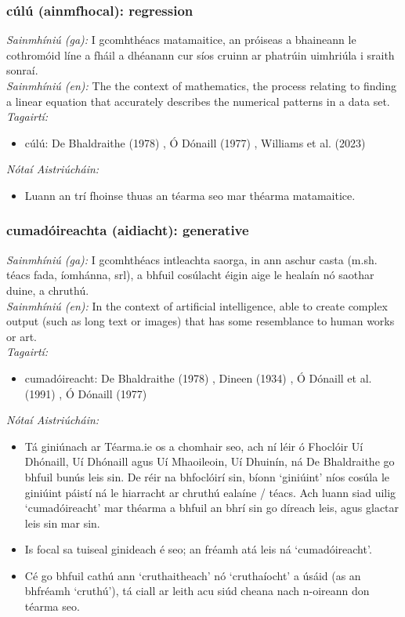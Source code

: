 \subsubsection*{cúlú (ainmfhocal): regression}
 \noindent \textit{Sainmhíniú (ga):} I gcomhthéacs matamaitice, an próiseas a bhaineann le cothromóid líne a fháil a dhéanann cur síos cruinn ar phatrúin uimhriúla i sraith sonraí.
\\
 \noindent \textit{Sainmhíniú (en):} The the context of mathematics, the process relating to finding a linear equation that accurately describes the numerical patterns in a data set.
\\
 \noindent \textit{Tagairtí:}
\begin{itemize}
	\item cúlú: De Bhaldraithe (1978) \cite{de-bhaldraithe}, Ó Dónaill (1977) \cite{odonaill}, Williams et al. (2023) \cite{storchiste}
\end{itemize}

 \noindent \textit{Nótaí Aistriúcháin:}
\begin{itemize}
	\item Luann an trí fhoinse thuas an téarma seo mar théarma matamaitice.
\end{itemize}


\subsubsection*{cumadóireachta (aidiacht): generative}
 \noindent \textit{Sainmhíniú (ga):} I gcomhthéacs intleachta saorga, in ann aschur casta (m.sh. téacs fada, íomhánna, srl), a bhfuil cosúlacht éigin aige le healaín nó saothar duine, a chruthú.
\\
 \noindent \textit{Sainmhíniú (en):} In the context of artificial intelligence, able to create complex output (such as long text or images) that has some resemblance to human works or art.
\\
 \noindent \textit{Tagairtí:}
\begin{itemize}
	\item cumadóireacht: De Bhaldraithe (1978) \cite{de-bhaldraithe}, Dineen (1934) \cite{dineen}, Ó Dónaill et al. (1991) \cite{focloir-beag}, Ó Dónaill (1977) \cite{odonaill}
\end{itemize}

 \noindent \textit{Nótaí Aistriúcháin:}
\begin{itemize}
	\item Tá giniúnach ar Téarma.ie os a chomhair seo, ach ní léir ó Fhoclóir Uí Dhónaill, Uí Dhónaill agus Uí Mhaoileoin, Uí Dhuinín, ná De Bhaldraithe go bhfuil bunús leis sin. De réir na bhfoclóirí sin, bíonn `giniúint' níos cosúla le giniúint páistí ná le hiarracht ar chruthú ealaíne / téacs. Ach luann siad uilig `cumadóireacht' mar théarma a bhfuil an bhrí sin go díreach leis, agus glactar leis sin mar sin.
	\item Is focal sa tuiseal ginideach é seo; an fréamh atá leis ná `cumadóireacht'.
	\item Cé go bhfuil cathú ann `cruthaitheach' nó `cruthaíocht' a úsáid (as an bhfréamh `cruthú'), tá ciall ar leith acu siúd cheana nach n-oireann don téarma seo.
\end{itemize}


